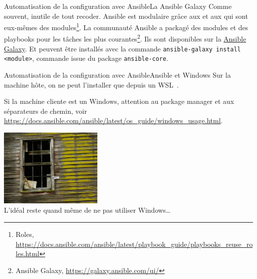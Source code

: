 \documentclass{beamer}
\begin{document}
    \begin{frame}{Automatisation de la configuration avec Ansible}{La Ansible Galaxy}
        Comme souvent, inutile de tout recoder.
        Ansible est modulaire grâce aux  et aux  qui sont eux-mêmes des modules\footnote{Roles, \url{https://docs.ansible.com/ansible/latest/playbook_guide/playbooks_reuse_roles.html}}.
        \bigbreak
        La communauté Ansible a packagé des modules et des playbooks pour les tâches les plus courantes\footnote{Ansible Galaxy, \url{https://galaxy.ansible.com/ui/}}.
        Ils sont disponibles sur la \href{https://galaxy.ansible.com/}{Ansible Galaxy}.
        Et peuvent être installés avec la commande \lstinline{ansible-galaxy install <module>}, commande issue du package \lstinline{ansible-core}.
    \end{frame}

    \begin{frame}{Automatisation de la configuration avec Ansible}{Ansible et Windows}
        Sur la machine hôte, on ne peut l'installer que depuis un WSL~.
        \begin{dangercolorbox}
            Si la machine cliente est un Windows, attention au package manager et aux séparateurs de chemin, voir \url{https://docs.ansible.com/ansible/latest/os_guide/windows_usage.html}.
        \end{dangercolorbox}
        \bigbreak
        \centering
        \includegraphics[width=5cm]{image/broken-windows} \\ L'idéal reste quand même de ne pas utiliser Windows\ldots \\
    \end{frame}
\end{document}
